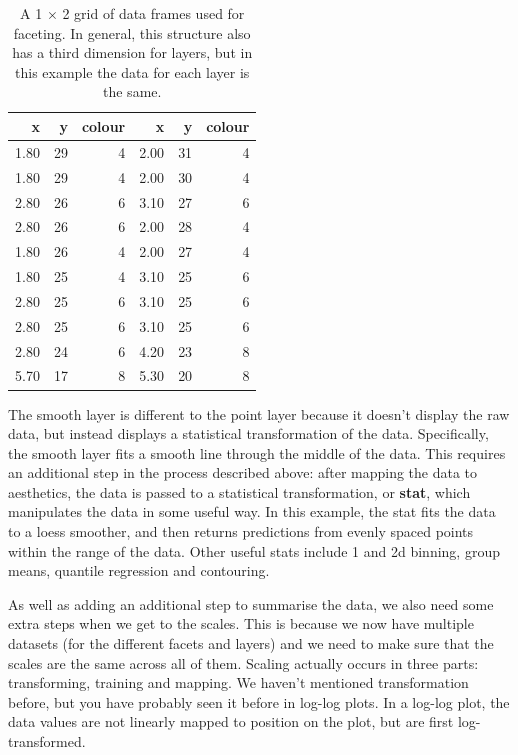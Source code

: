 \begin{table}[ht]
\centering
\begin{tabular}{rrrrrr}
  \hline
x & y & colour & x & y & colour \\ 
  \hline
1.80 &  29 &   4 & 2.00 &  31 &   4 \\ 
  1.80 &  29 &   4 & 2.00 &  30 &   4 \\ 
  2.80 &  26 &   6 & 3.10 &  27 &   6 \\ 
  2.80 &  26 &   6 & 2.00 &  28 &   4 \\ 
  1.80 &  26 &   4 & 2.00 &  27 &   4 \\ 
  1.80 &  25 &   4 & 3.10 &  25 &   6 \\ 
  2.80 &  25 &   6 & 3.10 &  25 &   6 \\ 
  2.80 &  25 &   6 & 3.10 &  25 &   6 \\ 
  2.80 &  24 &   6 & 4.20 &  23 &   8 \\ 
  5.70 &  17 &   8 & 5.30 &  20 &   8 \\ 
   \hline
\end{tabular}
\caption{A 1 $\times$ 2 grid of data frames used for faceting.  In general, this structure also has a third dimension for layers, but in this example the data for each layer is the same.} 
\label{tbl:data-complex}
\end{table}

The smooth layer is different to the point layer because it doesn't
display the raw data, but instead displays a statistical transformation
of the data. Specifically, the smooth layer fits a smooth line through
the middle of the data. This requires an additional step in the process
described above: after mapping the data to aesthetics, the data is
passed to a statistical transformation, or \textbf{stat}, which
manipulates the data in some useful way. In this example, the stat fits
the data to a loess smoother, and then returns predictions from evenly
spaced points within the range of the data. Other useful stats include 1
and 2d binning, group means, quantile regression and contouring.

As well as adding an additional step to summarise the data, we also need
some extra steps when we get to the scales. This is because we now have
multiple datasets (for the different facets and layers) and we need to
make sure that the scales are the same across all of them. Scaling
actually occurs in three parts: transforming, training and mapping. We
haven't mentioned transformation before, but you have probably seen it
before in log-log plots. In a log-log plot, the data values are not
linearly mapped to position on the plot, but are first log-transformed.

